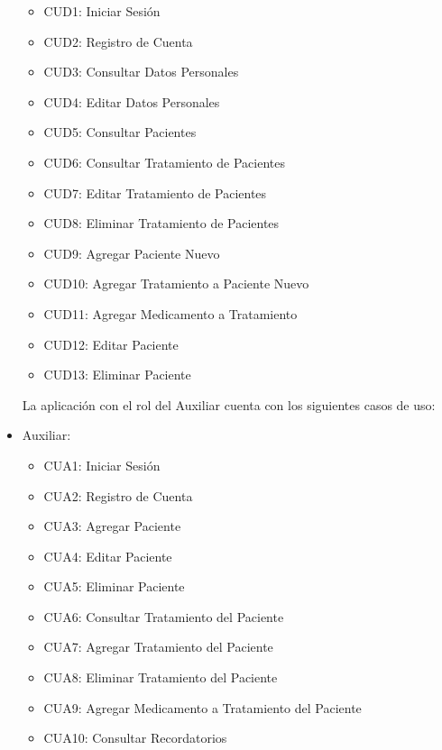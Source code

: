 \begin{itemize}
\begin{itemize}
		\item CUD1: Iniciar Sesión
		\item CUD2: Registro de Cuenta
		\item CUD3: Consultar Datos Personales
		\item CUD4: Editar Datos Personales
		\item CUD5: Consultar Pacientes
		\item CUD6: Consultar Tratamiento de Pacientes
		\item CUD7: Editar Tratamiento de Pacientes
		\item CUD8: Eliminar Tratamiento de Pacientes
		\item CUD9: Agregar Paciente Nuevo
		\item CUD10: Agregar Tratamiento a Paciente Nuevo
		\item CUD11: Agregar Medicamento a Tratamiento
		\item CUD12: Editar Paciente
		\item CUD13: Eliminar Paciente
		
	\end{itemize}
	
La aplicación con el rol del Auxiliar cuenta con los siguientes casos de uso:
	
	\item Auxiliar:
		\begin{itemize}
		
		
		\item CUA1: Iniciar Sesión
		\item CUA2: Registro de Cuenta
		\item CUA3: Agregar Paciente
		\item CUA4: Editar Paciente
		\item CUA5: Eliminar Paciente
		\item CUA6: Consultar Tratamiento del Paciente
		\item CUA7: Agregar Tratamiento del Paciente
		\item CUA8: Eliminar Tratamiento del Paciente
		\item CUA9: Agregar Medicamento a Tratamiento del Paciente
		\item CUA10: Consultar Recordatorios
			
		\end{itemize}
	

	
\end{itemize}


